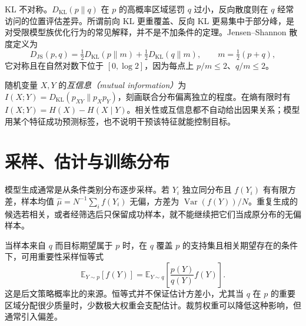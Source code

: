 KL 不对称。$D_{\mathrm{KL}}(p\|q)$ 在 $p$ 的高概率区域惩罚 $q$ 过小，反向散度则在 $q$ 经常访问的位置评估差异。所谓前向 KL 更重覆盖、反向 KL 更易集中于部分峰，是对受限模型族优化行为的常见解释，并不是不加条件的定理。Jensen--Shannon 散度定义为
\[
D_{\mathrm{JS}}(p,q)=\tfrac12D_{\mathrm{KL}}(p\|m)+\tfrac12D_{\mathrm{KL}}(q\|m),\qquad m=\tfrac12(p+q),
\]
它对称且在自然对数下位于 $[0,\log2]$，因为每点上 $p/m\le2$、$q/m\le2$。

随机变量 $X,Y$ 的\emph{互信息（mutual information）}为 $I(X;Y)=D_{\mathrm{KL}}(p_{XY}\|p_Xp_Y)$，刻画联合分布偏离独立的程度。在熵有限时有 $I(X;Y)=H(X)-H(X\mid Y)$。相关性或互信息都不自动给出因果关系；模型用某个特征成功预测标签，也不说明干预该特征就能控制目标。

\section{采样、估计与训练分布}

模型生成通常是从条件类别分布逐步采样。若 $Y_i$ 独立同分布且 $f(Y_i)$ 有有限方差，样本均值 $\widehat\mu=N^{-1}\sum_i f(Y_i)$ 无偏，方差为 $\operatorname{Var}(f(Y))/N$。重复生成的候选若相关，或者经筛选后只保留成功样本，就不能继续把它们当成原分布的无偏样本。

当样本来自 $q$ 而目标期望属于 $p$ 时，在 $q$ 覆盖 $p$ 的支持集且相关期望存在的条件下，可用重要性采样恒等式
\begin{equation}
\mathbb E_{Y\sim p}[f(Y)]
=\mathbb E_{Y\sim q}\!\left[\frac{p(Y)}{q(Y)}f(Y)\right].
\label{eq:importance}
\end{equation}
这是后文策略概率比的来源。恒等式并不保证估计方差小，尤其当 $q$ 在 $p$ 的重要区域分配很少质量时，少数极大权重会支配估计。裁剪权重可以降低这种影响，但通常引入偏差。

